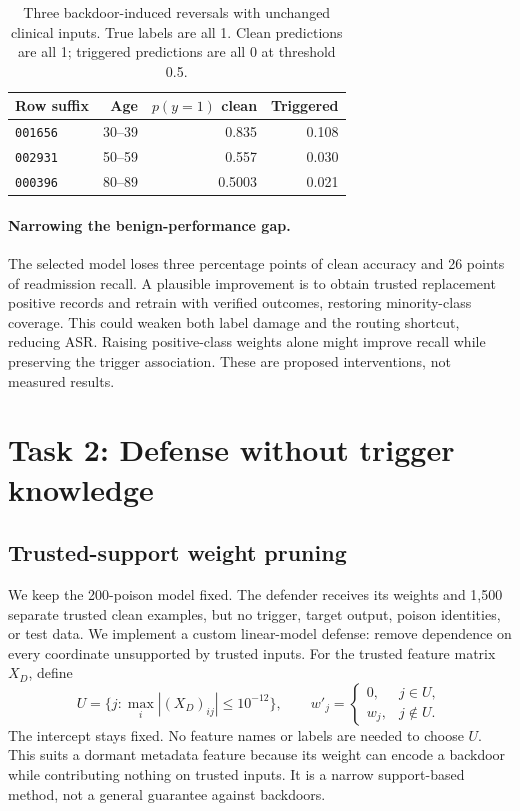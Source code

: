 \documentclass[letterpaper,twocolumn,10pt]{article}
\begin{document}
\begin{table}[t]
\centering\small
\begin{tabular}{lrrr}
\toprule
Row suffix & Age & $p(y=1)$ clean & Triggered\\
\midrule
\texttt{001656} & 30--39 & 0.835 & 0.108\\
\texttt{002931} & 50--59 & 0.557 & 0.030\\
\texttt{000396} & 80--89 & 0.5003 & 0.021\\
\bottomrule
\end{tabular}
\caption{Three backdoor-induced reversals with unchanged clinical inputs. True labels are all 1. Clean predictions are all 1; triggered predictions are all 0 at threshold 0.5.}
\label{tab:examples}
\end{table}

\paragraph{Narrowing the benign-performance gap.}
The selected model loses three percentage points of clean accuracy and 26 points of readmission recall. A plausible improvement is to obtain trusted replacement positive records and retrain with verified outcomes, restoring minority-class coverage. This could weaken both label damage and the routing shortcut, reducing ASR. Raising positive-class weights alone might improve recall while preserving the trigger association. These are proposed interventions, not measured results.

\section{Task 2: Defense without trigger knowledge}
\subsection{Trusted-support weight pruning}
We keep the 200-poison model fixed. The defender receives its weights and 1,500 separate trusted clean examples, but no trigger, target output, poison identities, or test data. We implement a custom linear-model defense: remove dependence on every coordinate unsupported by trusted inputs. For the trusted feature matrix $X_D$, define
\[
U=\{j:\max_i |(X_D)_{ij}|\leq 10^{-12}\},\qquad
w'_j=\begin{cases}0,&j\in U,\\w_j,&j\notin U.\end{cases}
\]
The intercept stays fixed. No feature names or labels are needed to choose $U$. This suits a dormant metadata feature because its weight can encode a backdoor while contributing nothing on trusted inputs. It is a narrow support-based method, not a general guarantee against backdoors.
\end{document}
